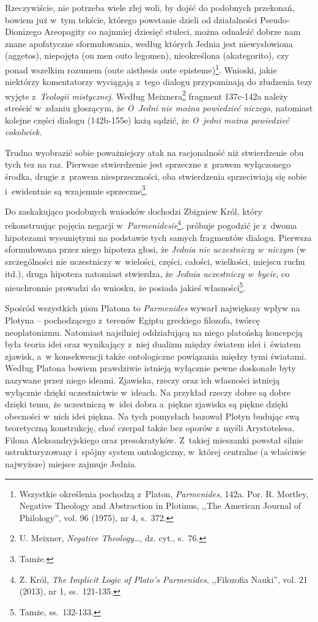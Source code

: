 Rzeczywiście, nie potrzeba wiele złej woli, by dojść do podobnych przekonań, bowiem już w~tym tekście, którego powstanie dzieli od działalności Pseudo-Dionizego Areopagity co najmniej dziesięć stuleci, można odnaleźć dobrze nam znane apofatyczne sformułowania, według których Jednia jest niewysłowiona (aggetos), niepojęta (ou men outo legomen), nieokreślona (akategorito), czy ponad wszelkim rozumem (oute aisthesis oute episteme)\footnote{ Wszystkie określenia pochodzą z~Platon, \textit{Parmenides}, 142a. Por. R. Mortley, Negative Theology and Abstraction in Plotinus, ,,The American Journal of Philology'', vol. 96 (1975), nr 4, s.~372.}. Wnioski, jakie niektórzy komentatorzy wyciągają z~tego dialogu przypominają do złudzenia tezy wyjęte z~\textit{Teologii mistycznej}. Według Meixnera\footnote{ U. Meixner, \textit{Negative Theology}…, dz. cyt., s.~76.} fragment 137c-142a należy streścić w~zdaniu głoszącym, że \textit{O~Jedni nie można powiedzieć niczego}, natomiast kolejne części dialogu (142b-155e) każą sądzić, że \textit{O~jedni można powiedzieć cokolwiek}.

Trudno wyobrazić sobie poważniejszy atak na racjonalność niż stwierdzenie obu tych tez na raz. Pierwsze stwierdzenie jest sprzeczne z~prawem wyłączonego środka, drugie z~prawem niesprzeczności, oba stwierdzenia sprzeciwiają się sobie i~ewidentnie są wzajemnie sprzeczne\footnote{ Tamże.}.

Do zaskakująco podobnych wniosków dochodzi Zbigniew Król, który rekonstruując pojęcia negacji w~\textit{Parmenidesie}\footnote{ Z. Król, \textit{The Implicit Logic of Plato's Parmenides}, ,,Filozofia Nauki'', vol. 21 (2013), nr 1, ss.~121-135.}, próbuje pogodzić je z~dwoma hipotezami wysuniętymi na podstawie tych samych fragmentów dialogu. Pierwsza sformułowana przez niego hipoteza głosi, że \textit{Jednia nie uczestniczy w~niczym} (w szczególności nie uczestniczy w~wielości, części, całości, wielkości, miejscu ruchu itd.), druga hipoteza natomiast stwierdza, że \textit{Jednia uczestniczy w~bycie}, co nieuchronnie prowadzi do wniosku, że posiada jakieś własności\footnote{ Tamże, ss.~132-133.}.

Spośród wszystkich pism Platona to \textit{Parmenides} wywarł największy wpływ na Plotyna -- pochodzącego z~terenów Egiptu greckiego filozofa, twórcę neoplatonizmu. Natomiast najsilniej oddziałującą na niego platońską koncepcją była teoria idei oraz wynikający z~niej dualizm między światem idei i~światem zjawisk, a~w konsekwencji także ontologiczne powiązania między tymi światami. Według Platona bowiem prawdziwie istnieją wyłącznie pewne doskonałe byty nazywane przez niego ideami. Zjawiska, rzeczy oraz ich własności istnieją wyłącznie dzięki uczestnictwie w~ideach. Na przykład rzeczy dobre są dobre dzięki temu, że uczestniczą w~idei dobra a~piękne zjawiska są piękne dzięki obecności w~nich idei piękna. Na tych pomysłach bazował Plotyn budując swą teoretyczną konstrukcję, choć czerpał także bez oporów z~myśli Arystotelesa, Filona Aleksandryjskiego oraz presokratyków. Z~takiej mieszanki powstał silnie ustrukturyzowany i~spójny system ontologiczny, w~której centralne (a właściwie najwyższe) miejsce zajmuje Jednia.

